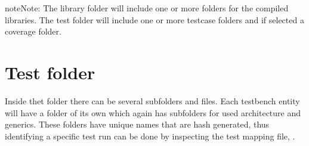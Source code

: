 \documentclass[letterpaper,10pt,english]{sphinxmanual}
\begin{document}
\begin{sphinxadmonition}{note}{Note:}
\sphinxAtStartPar
The library folder will include one or more folders for the compiled libraries.
The test folder will include one or more testcase folders and \sphinxhyphen{} if selected \sphinxhyphen{} a coverage folder.
\end{sphinxadmonition}


\section{Test folder}
\label{\detokenize{output:test-folder}}
\sphinxAtStartPar
Inside thet  folder there can be several sub\sphinxhyphen{}folders and files. Each testbench entity will have a folder of its own
which again has sub\sphinxhyphen{}folders for used architecture and generics. These  folders have unique names that are
hash generated, thus identifying a specific test run can be done by inspecting the test mapping file, .
\def\sphinxLiteralBlockLabel{\label{\detokenize{output:id1}}}
\end{document}
